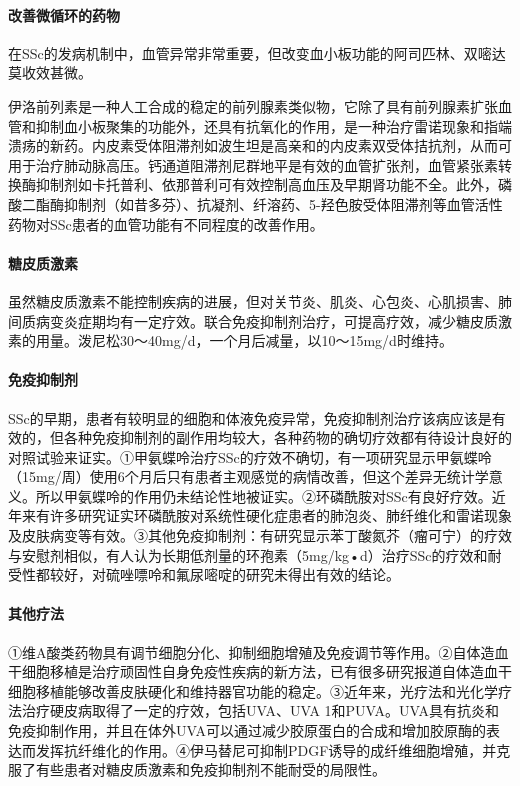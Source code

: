 \paragraph{改善微循环的药物}

在SSc的发病机制中，血管异常非常重要，但改变血小板功能的阿司匹林、双嘧达莫收效甚微。

伊洛前列素是一种人工合成的稳定的前列腺素类似物，它除了具有前列腺素扩张血管和抑制血小板聚集的功能外，还具有抗氧化的作用，是一种治疗雷诺现象和指端溃疡的新药。内皮素受体阻滞剂如波生坦是高亲和的内皮素双受体拮抗剂，从而可用于治疗肺动脉高压。钙通道阻滞剂尼群地平是有效的血管扩张剂，血管紧张素转换酶抑制剂如卡托普利、依那普利可有效控制高血压及早期肾功能不全。此外，磷酸二酯酶抑制剂（如昔多芬）、抗凝剂、纤溶药、5-羟色胺受体阻滞剂等血管活性药物对SSc患者的血管功能有不同程度的改善作用。

\paragraph{糖皮质激素}

虽然糖皮质激素不能控制疾病的进展，但对关节炎、肌炎、心包炎、心肌损害、肺间质病变炎症期均有一定疗效。联合免疫抑制剂治疗，可提高疗效，减少糖皮质激素的用量。泼尼松30～40mg/d，一个月后减量，以10～15mg/d时维持。

\paragraph{免疫抑制剂}

SSc的早期，患者有较明显的细胞和体液免疫异常，免疫抑制剂治疗该病应该是有效的，但各种免疫抑制剂的副作用均较大，各种药物的确切疗效都有待设计良好的对照试验来证实。①甲氨蝶呤治疗SSc的疗效不确切，有一项研究显示甲氨蝶呤（15mg/周）使用6个月后只有患者主观感觉的病情改善，但这个差异无统计学意义。所以甲氨蝶呤的作用仍未结论性地被证实。②环磷酰胺对SSc有良好疗效。近年来有许多研究证实环磷酰胺对系统性硬化症患者的肺泡炎、肺纤维化和雷诺现象及皮肤病变等有效。③其他免疫抑制剂：有研究显示苯丁酸氮芥（瘤可宁）的疗效与安慰剂相似，有人认为长期低剂量的环孢素（5mg/kg•d）治疗SSc的疗效和耐受性都较好，对硫唑嘌呤和氟尿嘧啶的研究未得出有效的结论。

\paragraph{其他疗法}

①维A酸类药物具有调节细胞分化、抑制细胞增殖及免疫调节等作用。②自体造血干细胞移植是治疗顽固性自身免疫性疾病的新方法，已有很多研究报道自体造血干细胞移植能够改善皮肤硬化和维持器官功能的稳定。③近年来，光疗法和光化学疗法治疗硬皮病取得了一定的疗效，包括UVA、UVA
1和PUVA。UVA具有抗炎和免疫抑制作用，并且在体外UVA可以通过减少胶原蛋白的合成和增加胶原酶的表达而发挥抗纤维化的作用。④伊马替尼可抑制PDGF诱导的成纤维细胞增殖，并克服了有些患者对糖皮质激素和免疫抑制剂不能耐受的局限性。

